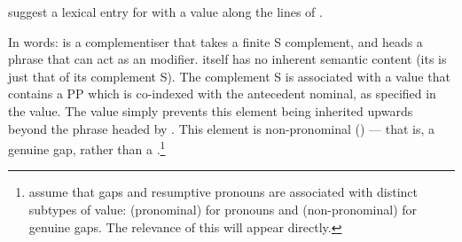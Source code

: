 \documentclass[output=paper
 	        ,biblatex
                ,babelshorthands
                ,newtxmath
                ,draftmode
                ,colorlinks, citecolor=brown
]{langscibook}
\begin{document}
\citeauthor{AbeilleGodard07} suggest a lexical entry for  with a 
value along the lines of .
\begin{exe}\ex\label{x:rc-72}
\end{exe}
In words:  is a complementiser that takes a finite S complement, and heads a
phrase that can act as an  modifier.  itself has no inherent semantic
content (its  is just that of its complement S). The complement S is
associated with a  value that contains a PP which is
co-indexed with the antecedent nominal, as specified in the  value. The
 value simply prevents this  element being inherited upwards
beyond the phrase headed by . This  element is non-pronominal
() --- that is, a genuine gap, rather than a .\footnote{\cite{AbeilleGodard07} assume that gaps and resumptive pronouns are
  associated with distinct subtypes of  value:  (pronominal) for
  pronouns and  (non-pronominal) for genuine gaps. The relevance of this will
  appear directly.}
\end{document}
